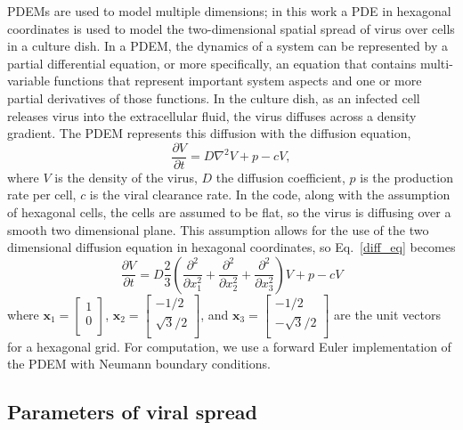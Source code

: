 PDEMs are used to model multiple dimensions; in this work a PDE in hexagonal coordinates is used to model the two-dimensional spatial spread of virus over cells in a culture dish. In a PDEM, the dynamics of a system can be represented by a partial differential equation, or more specifically, an equation that contains multi-variable functions that represent important system aspects and one or more partial derivatives of those functions. In the culture dish, as an infected cell releases virus into the extracellular fluid, the virus diffuses across a density gradient. The PDEM represents this diffusion with the diffusion equation, 
\begin{equation}
\frac{\partial V}{\partial t}=D \nabla^{2}V + p - cV, \label{diff_eq}
\end{equation}
where $V$ is the density of the virus, $D$ the diffusion coefficient, $p$ is the production rate per cell, $c$ is the viral clearance rate. In the code, along with the assumption of hexagonal cells, the cells are assumed to be flat, so the virus is diffusing over a smooth two dimensional plane. This assumption allows for the use of the two dimensional diffusion equation in hexagonal coordinates, so Eq.\ \eqref{diff_eq} becomes 
$$\frac{\partial V}{\partial t} = D\frac{2}{3} \left (\frac{\partial^2}{\partial x^2_1}+\frac{\partial^2}{\partial x^2_2}+\frac{\partial^2}{\partial x^2_3}\right )V + p -cV$$ 
where  
$\textbf{x}_1=
\left [
    \begin{array}{c}
        1 \\
        0 \\
    \end{array}
\right ]$, 
$\textbf{x}_2=
\left [
    \begin{array}{c}
        -1/2 \\
        \sqrt{3}/2 \\
    \end{array}
\right ]$, and 
$\textbf{x}_3=
\left [
    \begin{array}{c}
        -1/2 \\
        -\sqrt{3}/2 \\
    \end{array}
\right ]$ 
are the unit vectors for a hexagonal grid. For computation, we use a forward Euler implementation of the PDEM with Neumann boundary conditions.

\subsection{Parameters of viral spread}

